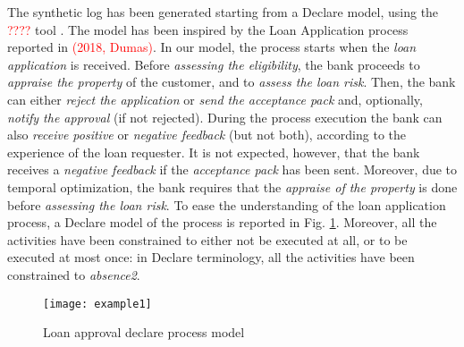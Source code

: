The synthetic log has been generated starting from a Declare model, using the \textcolor{red}{????} tool \cite{2020-Loreti}. The model has been inspired by the Loan Application process reported in \textcolor{red}{(2018, Dumas)}.  In our model, the process starts when the \emph{loan application} is received. Before \emph{assessing the eligibility}, the bank proceeds to \emph{appraise the property} of the customer, and to \emph{assess the loan risk}. Then, the bank can either \emph{reject the application} or \emph{send the acceptance pack} and, optionally, \emph{notify the approval} (if not rejected). During the process execution the bank can also \emph{receive positive} or \emph{negative feedback} (but not both), according to the experience of the loan requester. It is not expected, however, that the bank receives a \emph{negative feedback} if the \emph{acceptance pack} has been sent. Moreover, due to temporal optimization, the bank requires that the \emph{appraise of the property} is done before \emph{assessing the loan risk}.
To ease the understanding of the loan application process, a Declare model of the process is reported in Fig. \ref{fig:ex}. Moreover, all the activities have been constrained to either not be executed at all, or to be executed at most once: in Declare terminology, all the activities have been constrained to \emph{absence2}.

\begin{figure}[t]
\centering
\texttt{[image: example1]}
\caption{Loan approval declare process model }
\label{fig:ex}
\end{figure}

